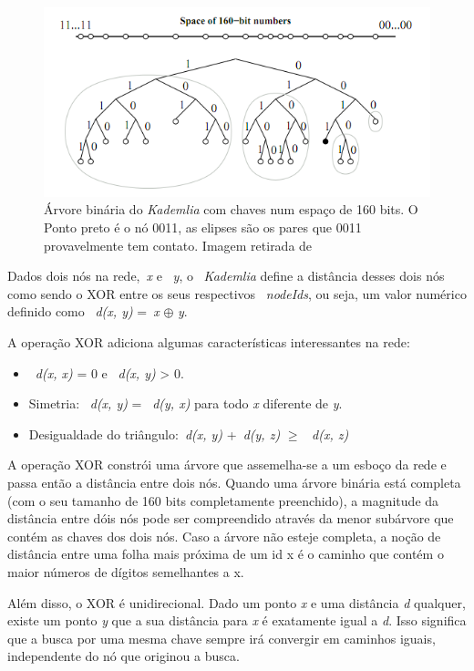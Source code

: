 \begin{figure}
	\centering
	\includegraphics[scale=0.5]{images/arvore-kademlia.png}
	\caption{Árvore binária do \emph{Kademlia} com chaves num espaço de 160 bits. O Ponto preto é o nó 0011, as elipses são os pares que 0011 provavelmente tem contato. Imagem retirada de~\cite{welzi11}}
	\label{fig:arvore-kademlia}
\end{figure}

Dados dois nós na rede,~\emph{x} e ~\emph{y}, o ~\emph{Kademlia} define a distância desses dois nós como sendo o XOR entre os seus respectivos ~\emph{nodeIds}, ou seja, um valor numérico definido como ~\emph{d(x, y)} =~\emph{x} $\oplus$ \emph{y}.

A operação XOR adiciona algumas características interessantes na rede:
\begin{itemize}
	\item ~\emph{d(x, x)} = 0 e ~\emph{d(x, y)} > 0.
	\item Simetria: ~\emph{d(x, y)} = ~\emph{d(y, x)} para todo \emph{x} diferente de \emph{y}.
	\item Desigualdade do triângulo:~\emph{d(x, y)} +~\emph{d(y, z)} $\ge$ ~\emph{d(x, z)}
\end{itemize}

A operação XOR constrói uma árvore que assemelha-se a um esboço da rede e passa então a distância entre dois nós. Quando uma árvore binária está completa (com o seu tamanho de 160 bits completamente preenchido), a magnitude da distância entre dóis nós pode ser compreendido através da menor subárvore que contém as chaves dos dois nós. Caso a árvore não esteje completa, a noção de distância entre uma folha mais próxima de um id x é o caminho que contém o maior números de dígitos semelhantes a x.

Além disso, o XOR é unidirecional. Dado um ponto \emph{x} e uma distância \emph{d} qualquer, existe um ponto \emph{y} que a sua distância para \emph{x} é exatamente igual a \emph{d}. Isso significa que a busca por uma mesma chave sempre irá convergir em caminhos iguais, independente do nó que originou a busca.

